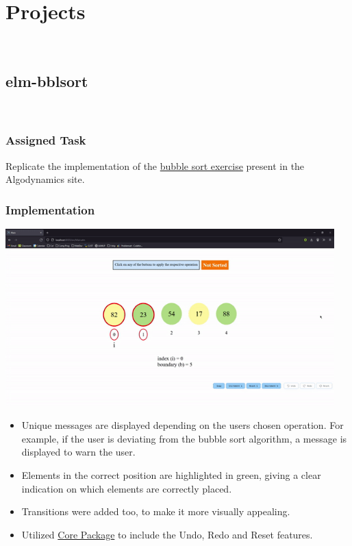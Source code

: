 \cleardoublepage

\section{Projects}

\begin{FlushLeft}
\\[1in]
\subsection{elm-bblsort}
\\[0.1in]
\subsubsection{Assigned Task}
Replicate the implementation of the \href{https://algodynamics.io/bubblesort/machines/bubblesortManual.html}{bubble sort exercise} present in the Algodynamics site.
\\[0.5in]
\subsubsection{Implementation}
\includegraphics[width=5in]{imgs/bbl-sort.png}

\begin{itemize}
    \item Unique messages are displayed depending on the users chosen operation. For example, if the user is deviating from the bubble sort algorithm, a message is displayed to warn the user. 
    \item Elements in the correct position are highlighted in green, giving a clear indication on which elements are correctly placed. 
    \item Transitions were added too, to make it more visually appealing. 
    \item Utilized \href{https://package.elm-lang.org/packages/algodynamics-iiith/core/latest/}{Core Package} to include the Undo, Redo and Reset features. 
\end{itemize}


\end{FlushLeft}
